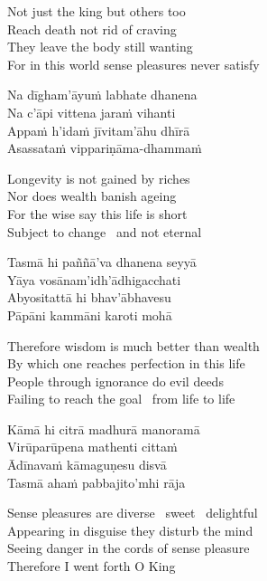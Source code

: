 \begin{english-verses}
  Not just the king but others too\\
  Reach death not rid of craving\\
  They leave the body still wanting\\
  For in this world sense pleasures never satisfy
\end{english-verses}

\begin{verses}
  Na dīgham'āyuṁ labhate dhanena\\
  Na c'āpi vittena jaraṁ vihanti\\
  Appaṁ h'idaṁ jīvitam'āhu dhīrā\\
  Asassataṁ vippariṇāma-dhammaṁ
\end{verses}

\begin{english-verses}
  Longevity is not gained by riches\\
  Nor does wealth banish ageing\\
  For the wise say this life is short\\
  Subject to change \breathmark\ and not eternal
\end{english-verses}

\begin{verses}
  Tasmā hi paññā'va dhanena seyyā\\
  Yāya vosānam'idh'ādhigacchati\\
  Abyositattā hi bhav'ābhavesu\\
  Pāpāni kammāni karoti mohā
\end{verses}

\begin{english-verses}
  Therefore wisdom is much better than wealth\\
  By which one reaches perfection in this life\\
  People through ignorance do evil deeds\\
  Failing to reach the goal \breathmark\ from life to life
\end{english-verses}

\begin{verses}
  Kāmā hi citrā madhurā manoramā\\
  Virūparūpena mathenti cittaṁ\\
  Ādīnavaṁ kāmaguṇesu disvā\\
  Tasmā ahaṁ pabbajito'mhi rāja
\end{verses}

\begin{english-verses}
  Sense pleasures are diverse \breathmark\ sweet \breathmark\ delightful\\
  Appearing in disguise they disturb the mind\\
  Seeing danger in the cords of sense pleasure\\
  Therefore I went forth O King
\end{english-verses}

